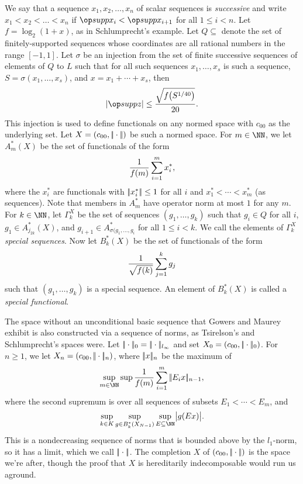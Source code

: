 We say that a sequence $x_1,x_2,\ldots,x_n$ of scalar sequences is {\it successive} and write
$x_1<x_2<\ldots<x_n$ if $\supp x_i < \supp x_{i+1}$ for all $1\le i<n$.
Let $f = \log_2(1+x)$, as in Schlumprecht's example. Let $Q\subseteq$ denote
the set of finitely-supported sequences whose coordinates are all rational numbers in the range $[-1,1]$.
Let $\sigma$ be an injection from the set of finite successive sequences of elements of $Q$ to $L$ such
that for all such sequences $x_1, \ldots, x_s$ is such a sequence, $S = \sigma(x_1,\ldots,x_s)$, and
$x = x_1 + \cdots + x_s$, then
$$\left|\supp z\right| \le {\sqrt{f\bigl(S^{1/40}\bigr)}\over 20}.$$
This injection is used to define functionals on any normed space with $c_{00}$ as the underlying set.
Let $X=(c_{00}, |\!|\cdot|\!|)$ be such a normed space. For $m\in \NN$, we let $A^*_m(X)$ be the set of functionals
of the form
$${1\over f(m)} \sum_{i=1}^m x_i^*,$$
where the $x_i^*$ are functionals with $|\!|x_i^*|\!|\le 1$ for all $i$ and $x_1^* < \cdots < x_m^*$
(as sequences). Note that members in $A^*_m$ have operator norm at most $1$ for any $m$. For $k\in \NN$,
let $\Gamma_k^X$ be the set of sequences $(g_1,\ldots, g_k)$ such that $g_i\in Q$ for all $i$,
$g_1\in A^*_{j_{2k}}(X)$, and $g_{i+1}\in A^*_{\sigma(g_1,\ldots,g_i}$ for all $1\le i<k$. We call the
elements of $\Gamma_k^X$ {\it special sequences}. Now let $B_k^*(X)$ be the set of functionals of the form
$$ {1\over \sqrt{f(k)}} \sum_{j=1}^k g_j $$
such that $(g_1, \ldots, g_k)$ is a special sequence. An element of $B_k^*(X)$ is called a {\it special
functional}.

The space without an unconditional basic sequence that Gowers and Maurey exhibit is also constructed via
a sequence of norms, as Tsirelson's and Schlumprecht's spaces were. Let $|\!|\cdot|\!|_0 = |\!|\cdot|\!|_{l_\infty}$
and
set $X_0 = (c_{00}, |\!|\cdot|\!|_0)$. For $n\ge 1$, we let $X_n = (c_{00}, |\!|\cdot|\!| _n)$,
where $|\!|x|\!|_n$ be the maximum of
$$\sup_{m\in \NN} \sup {1\over f(m)} \sum_{i=1}^m \norm{E_i x}_{n-1},$$
where the second supremum is over all sequences of subsets $E_1 < \cdots < E_m$, and
$$\sup_{k\in K} \sup_{g\in B^*_k(X_{N-1})} \sup_{E\subseteq \NN} \bigl|g(Ex)\bigr|.$$
This is a nondecreasing sequence of norms that is bounded above by the $l_1$-norm, so it has a limit, which
we call $|\!|\cdot|\!|$. The completion $X$ of $(c_{00}, |\!|\cdot|\!|)$ is the space we're after, though the proof
that $X$ is hereditarily indecomposable would run us aground.

